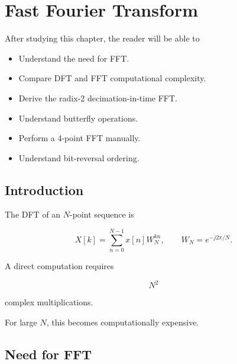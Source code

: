 
\chapter{Fast Fourier Transform}

\begin{tcolorbox}[colback=blue!5!white,colframe=blue!70!black,title=Learning Objectives]

After studying this chapter, the reader will be able to

\begin{itemize}
\item Understand the need for FFT.
\item Compare DFT and FFT computational complexity.
\item Derive the radix-2 decimation-in-time FFT.
\item Understand butterfly operations.
\item Perform a 4-point FFT manually.
\item Understand bit-reversal ordering.
\end{itemize}

\end{tcolorbox}


\section{Introduction}

The DFT of an \(N\)-point sequence is

\[
X[k]=
\sum_{n=0}^{N-1}
x[n]W_N^{kn},
\qquad
W_N=e^{-j2\pi/N}.
\]

A direct computation requires

\[
N^2
\]

complex multiplications.

For large \(N\), this becomes computationally expensive.


\section{Need for FFT}

